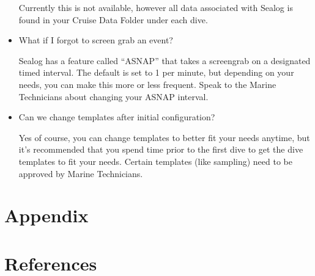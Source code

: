 \documentclass[
  letterpaper,
  DIV=11,
  numbers=noendperiod]{scrreprt}
\newlength{\cslhangindent}
\newlength{\cslentryspacingunit} %
\newenvironment{CSLReferences}[2] %
 {%
  \setlength{\parindent}{0pt}
  \ifodd #1
  \let\oldpar\par
  \def\par{\hangindent=\cslhangindent\oldpar}
  \fi
  \setlength{\parskip}{#2\cslentryspacingunit}
 }%
 {}
\begin{document}
\begin{itemize}
  Currently this is not available, however all data associated with
  Sealog is found in your Cruise Data Folder under each dive.
\item
  What if I forgot to screen grab an event?

  Sealog has a feature called ``ASNAP'' that takes a screengrab on a
  designated timed interval. The default is set to 1 per minute, but
  depending on your needs, you can make this more or less frequent.
  Speak to the Marine Technicians about changing your ASNAP interval.
\item
  Can we change templates after initial configuration?

  Yes of course, you can change templates to better fit your needs
  anytime, but it's recommended that you spend time prior to the first
  dive to get the dive templates to fit your needs. Certain templates
  (like sampling) need to be approved by Marine Technicians.
\end{itemize}

\appendix
{}

\hypertarget{appendix}{%
\chapter{Appendix}\label{appendix}}

\hypertarget{references}{%
\chapter*{References}\label{references}}


\hypertarget{refs}{}
\begin{CSLReferences}{0}{0}
\end{CSLReferences}
\end{document}

